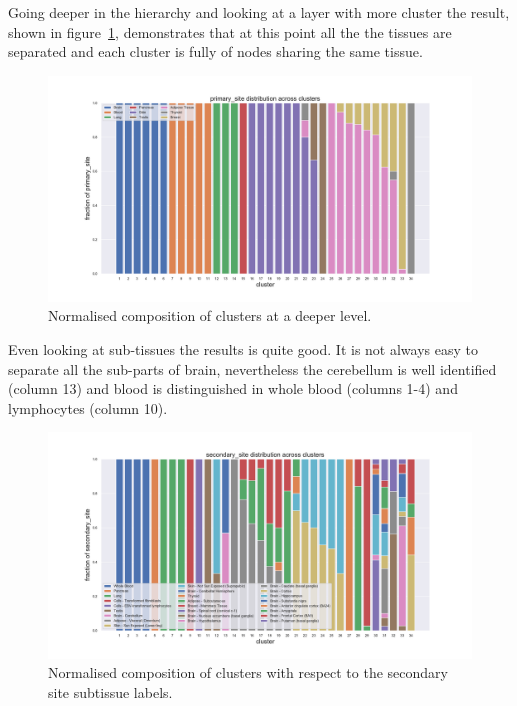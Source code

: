 Going deeper in the hierarchy and looking at a layer with more cluster the result, shown in figure~\ref{fig:topic/gtex/oversigma_10tissue/fraction_clustercomposition_l2_primary_site}, demonstrates that at this point all the the tissues are separated and each cluster is fully of nodes sharing the same tissue.
\begin{figure}[htb!]
    \centering
    \includegraphics[width=0.9\linewidth]{pictures/topic/gtex/oversigma_10tissue/fraction_clustercomposition_l2_primary_site.pdf}
    \caption{Normalised composition of clusters at a deeper level.}
    \label{fig:topic/gtex/oversigma_10tissue/fraction_clustercomposition_l2_primary_site}
\end{figure}
Even looking at sub-tissues the results is quite good. It is not always easy to separate all the sub-parts of brain, nevertheless the cerebellum is well identified (column 13) and blood is distinguished in whole blood (columns 1-4) and lymphocytes (column 10).
\begin{figure}[htb!]
    \centering
    \includegraphics[width=0.9\linewidth]{pictures/topic/gtex/oversigma_10tissue/fraction_clustercomposition_l2_secondary_site.pdf}
    \caption{Normalised composition of clusters with respect to the secondary site subtissue labels.}
    \label{fig:topic/gtex/oversigma_10tissue/fraction_clustercomposition_l2_secondary_site}
\end{figure}

